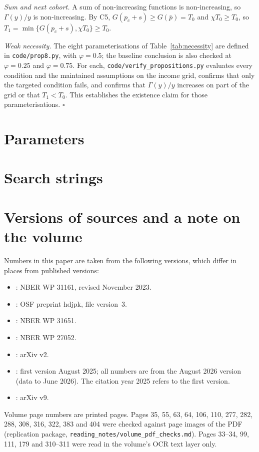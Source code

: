 \documentclass[12pt]{article}
\theoremstyle{remark}
\begin{document}
\emph{Sum and next cohort.} A sum of non-increasing functions is non-increasing, so $\Gamma(y)/y$ is non-increasing. By C5, $G(p_c+s)\ge G(\bar p)=T_0$ and $\chi T_0\ge T_0$, so $T_1=\min\{G(p_c+s),\chi T_0\}\ge T_0$.

\emph{Weak necessity.} The eight parameterisations of Table~\ref{tab:necessity} are defined in \texttt{code/prop8.py}, with $\varphi=0.5$; the baseline conclusion is also checked at $\varphi=0.25$ and $\varphi=0.75$. For each, \texttt{code/verify\_propositions.py} evaluates every condition and the maintained assumptions on the income grid, confirms that only the targeted condition fails, and confirms that $\Gamma(y)/y$ increases on part of the grid or that $T_1<T_0$. This establishes the existence claim for those parameterisations. $\square$

\section{Parameters}\label{app:params}


\section{Search strings}\label{app:search}


\section{Versions of sources and a note on the volume}\label{app:versions}\label{app:volume}
Numbers in this paper are taken from the following versions, which differ in places from published versions:
\begin{itemize}[itemsep=0pt]
\item \citet{brynjolfsson2025work}: NBER WP 31161, revised November 2023.
\item \citet{otis2026uneven}: OSF preprint hdjpk, file version~3.
\item \citet{dube2025policing}: NBER WP 31651.
\item \citet{acemoglu2020tax}: NBER WP 27052.
\item \citet{steyvers2025know}: arXiv v2.
\item \citet{brynjolfsson2025canaries}: first version August 2025; all numbers are from the August 2026 version (data to June 2026). The citation year 2025 refers to the first version.
\item \citet{ide2025automation}: arXiv v9.
\end{itemize}
Volume page numbers are printed pages. Pages 35, 55, 63, 64, 106, 110, 277, 282, 288, 308, 316, 322, 383 and 404 were checked against page images of the PDF (replication package, \texttt{reading\_notes/volume\_pdf\_checks.md}). Pages 33--34, 99, 111, 179 and 310--311 were read in the volume's OCR text layer only.
\end{document}
